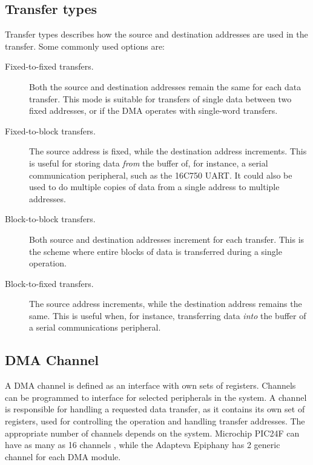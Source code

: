 \subsection{Transfer types}
Transfer types describes how the source and destination addresses are used in the transfer. \cite{microchip54}
Some commonly used options are:
\begin{description}
    \item[Fixed-to-fixed transfers.]
    Both the source and destination addresses remain the same for each data transfer.
    This mode is suitable for transfers of single data between two fixed addresses,
    or if the DMA operates with single-word transfers.
    \item[Fixed-to-block transfers.]
    The source address is fixed, while the destination address increments.
    This is useful for storing data \emph{from} the buffer of, for instance, a serial
    communication peripheral, such as the 16C750 UART.
    It could also be used to do multiple copies of data from a single address to multiple addresses.
    \item[Block-to-block transfers.]
    Both source and destination addresses increment for each transfer.
    This is the scheme where entire blocks of data is transferred during a single operation.
    \item[Block-to-fixed transfers.]
    The source address increments, while the destination address remains the same.
    This is useful when, for instance, transferring data \emph{into} the buffer of a
    serial communications peripheral.
\end{description}


\subsection{DMA Channel}
A DMA channel is defined as an interface with own sets of registers. \cite{DMAOxford}
Channels can be programmed to interface for selected peripherals in the system.
A channel is responsible for handling a requested data transfer, as it contains its own set of registers, used for controlling the operation and handling transfer addresses.
The  appropriate number of channels depends on the system.
Microchip PIC24F can have as many as 16 channels \cite{microchip54}, while the Adapteva Epiphany \cite{epiphany} has 2 generic channel for each DMA module.

